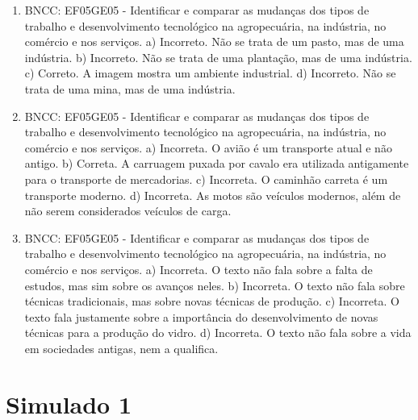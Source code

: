 \begin{enumerate}
\item
BNCC: EF05GE05 - Identificar e comparar as mudanças dos tipos de trabalho
e desenvolvimento tecnológico na agropecuária, na indústria, no comércio
e nos serviços.
a) Incorreto. Não se trata de um pasto, mas de uma indústria.
b) Incorreto. Não se trata de uma plantação, mas de uma indústria.
c) Correto. A imagem mostra um ambiente industrial.
d) Incorreto. Não se trata de uma mina, mas de uma indústria.

\item
BNCC: EF05GE05 - Identificar e comparar as mudanças dos tipos de trabalho
e desenvolvimento tecnológico na agropecuária, na indústria, no comércio
e nos serviços.
a) Incorreta. O avião é um transporte atual e não antigo.
b) Correta. A carruagem puxada por cavalo era utilizada antigamente para o
transporte de mercadorias.
c) Incorreta. O caminhão carreta é um transporte moderno.
d) Incorreta. As motos são veículos modernos, além de não serem considerados veículos de carga.

\item
BNCC: EF05GE05 - Identificar e comparar as mudanças dos tipos de trabalho
e desenvolvimento tecnológico na agropecuária, na indústria, no comércio
e nos serviços.
a) Incorreta. O texto não fala sobre a falta de estudos, mas sim sobre
os avanços neles.
b) Incorreta. O texto não fala sobre técnicas tradicionais, mas sobre
novas técnicas de produção.
c) Incorreta. O texto fala justamente sobre a importância do
desenvolvimento de novas técnicas para a produção do vidro.
d) Incorreta. O texto não fala sobre a vida em sociedades antigas, nem a
qualifica.
\end{enumerate}

\section*{Simulado 1}

